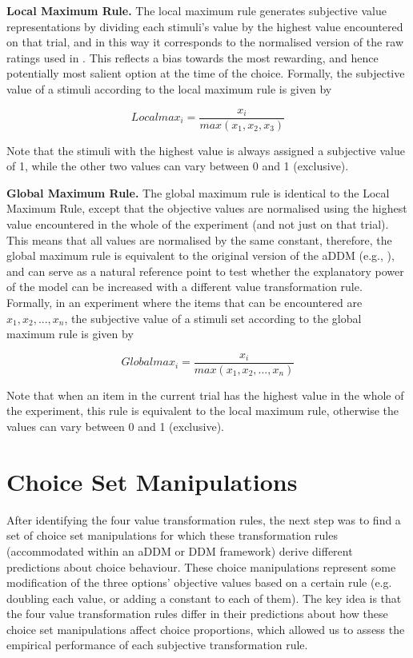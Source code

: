 \documentclass[11pt,a4paper]{article}
\begin{document}
\textbf{Local Maximum Rule.} The local maximum rule generates subjective value representations by dividing each stimuli's value by the highest value encountered on that trial, and in this way it corresponds to the normalised version of the raw ratings used in . This reflects a bias towards the most rewarding, and hence potentially most salient option at the time of the choice. Formally, the subjective value of a stimuli according to the local maximum rule is given by

\begin{equation}
Local max_{i}=\frac{x_i}{max(x_1,x_2,x_3)}
\label{eq:locmax}
\end{equation}

Note that the stimuli with the highest value is always assigned a subjective value of 1, while the other two values can vary between 0 and 1 (exclusive).

\textbf{Global Maximum Rule.} The global maximum rule is identical to the Local Maximum Rule, except that the objective values are normalised using the highest value encountered in the whole of the experiment (and not just on that trial). This means that all values are normalised by the same constant, therefore, the global maximum rule is equivalent to the original version of the aDDM (e.g., ), and can serve as a natural reference point to test whether the explanatory power of the model can be increased with a different value transformation rule. Formally, in an experiment where the items that can be encountered are $x_1, x_2, ..., x_n$, the subjective value of a stimuli set according to the global maximum rule is given by

\begin{equation}
Globalmax_{i}=\frac{x_i}{max(x_1,x_2,...,x_n)}
\label{eq:globmax}
\end{equation}

Note that when an item in the current trial has the highest value in the whole of the experiment, this rule is equivalent to the local maximum rule, otherwise the values can vary between 0 and 1 (exclusive). 

\section{Choice Set Manipulations} \label{chap1choicesetman}

After identifying the four value transformation rules, the next step was to find a set of choice set manipulations for which these transformation rules (accommodated within an aDDM or DDM framework) derive different predictions about choice behaviour. These choice manipulations represent some modification of the three options' objective values based on a certain rule (e.g. doubling each value, or adding a constant to each of them). The key idea is that the four value transformation rules differ in their predictions about how these choice set manipulations affect choice proportions, which allowed us to assess the empirical performance of each subjective transformation rule. 
\end{document}
